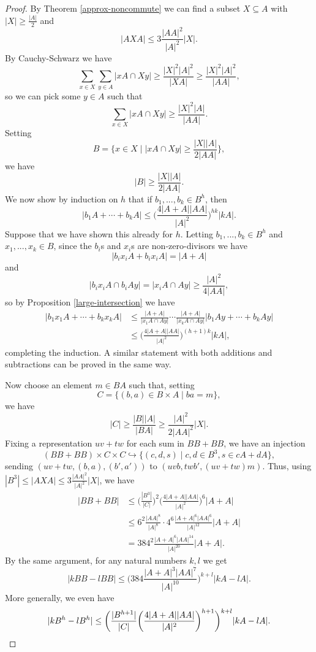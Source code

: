 \begin{proof} By Theorem \ref{approx-noncommute} we can find a subset $X\subseteq A$ with $|X| \ge \frac{|A|}{2}$ and
\[
|AXA| \le 3\frac{|AA|^2}{|A|^2}|X|.
\]
By Cauchy-Schwarz we have
\[
\sum_{x\in X}\sum_{y\in A} |xA\cap Xy| \ge \frac{|X|^2|A|^2}{|XA|} \ge \frac{|X|^2|A|^2}{|AA|},
\]
so we can pick some $y \in A$ such that
\[
\sum_{x\in X} |xA\cap Xy| \ge \frac{|X|^2|A|}{|AA|}.
\]
Setting
\[
B = \bigg\{x\in X\mid |xA\cap Xy| \ge \frac{|X||A|}{2|AA|}\bigg\},
\]
we have
\[
|B| \ge \frac{|X||A|}{2|AA|}.
\]
We now show by induction on $h$ that if $b_1, ..., b_k \in B^h$, then
\[
|b_1A + \cdots + b_kA| \le \bigg(\frac{4|A+A||AA|}{|A|^2}\bigg)^{hk}|kA|.
\]
Suppose that we have shown this already for $h$. Letting $b_1, ..., b_k \in B^h$ and $x_1, ..., x_k \in B$, since the $b_i$s and $x_i$s are non-zero-divisors we have
\[
|b_ix_iA + b_ix_iA| = |A+A|
\]
and
\[
|b_ix_iA\cap b_iAy| = |x_iA\cap Ay| \ge \frac{|A|^2}{4|AA|},
\]
so by Proposition \ref{large-intersection} we have
\begin{align*}
|b_1x_1A + \cdots + b_kx_kA| &\le \frac{|A+A|}{|x_1A\cap Ay|}\cdots \frac{|A+A|}{|x_kA\cap Ay|}|b_1Ay+\cdots +b_kAy|\\
&\le \bigg(\frac{4|A+A||AA|}{|A|^2}\bigg)^{(h+1)k}|kA|,
\end{align*}
completing the induction. A similar statement with both additions and subtractions can be proved in the same way.

Now choose an element $m \in BA$ such that, setting
\[
C = \{(b,a)\in B\times A\mid ba = m\},
\]
we have
\[
|C| \ge \frac{|B||A|}{|BA|} \ge \frac{|A|^2}{2|AA|^2}|X|.
\]
Fixing a representation $uv+tw$ for each sum in $BB+BB$, we have an injection
\[
(BB+BB)\times C\times C \hookrightarrow \{(c,d,s)\mid c,d \in B^3, s\in cA+dA\},
\]
sending $(uv+tw,(b,a),(b',a'))$ to $(uvb, twb', (uv+tw)m)$. Thus, using $|B^3| \le |AXA| \le 3\frac{|AA|^2}{|A|^2}|X|$, we have
\begin{align*}
|BB+BB| &\le \bigg(\frac{|B^3|}{|C|}\bigg)^2\bigg(\frac{4|A+A||AA|}{|A|^2}\bigg)^6|A+A|\\
&\le 6^2\frac{|AA|^8}{|A|^8}\cdot 4^6\frac{|A+A|^6|AA|^6}{|A|^{12}}|A+A|\\
&= 384^2\frac{|A+A|^6|AA|^{14}}{|A|^{20}}|A+A|.
\end{align*}
By the same argument, for any natural numbers $k,l$ we get
\[
|kBB-lBB| \le \bigg(384\frac{|A+A|^3|AA|^7}{|A|^{10}}\bigg)^{k+l}|kA-lA|.
\]
More generally, we even have
\[
|kB^h-lB^h| \le \bigg(\frac{|B^{h+1}|}{|C|}\bigg(\frac{4|A+A||AA|}{|A|^2}\bigg)^{h+1}\bigg)^{k+l}|kA-lA|.\qedhere
\]
\end{proof}

